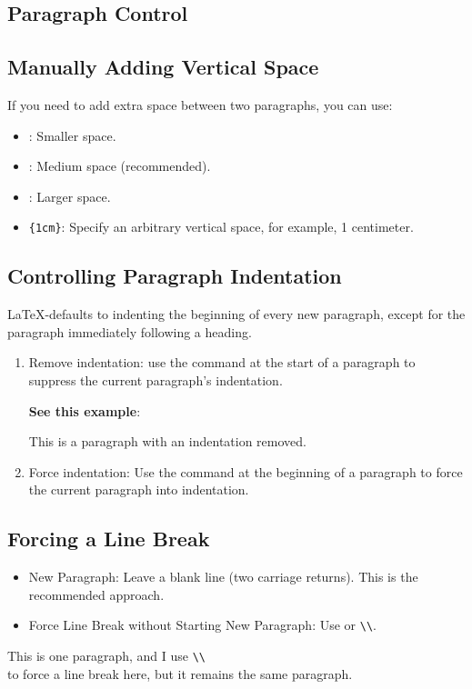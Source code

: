 \documentclass[12pt, letterpaper]{article}
\begin{document}
\begin{spacing}{1.3}
\section{Paragraph Control}
\subsection{Manually Adding Vertical Space}
If you need to add extra space between two paragraphs, you can use:
\begin{itemize}
    \item \texttt{\string\smallskip}: Smaller space.
    \item \texttt{\string\medskip}: Medium space (recommended).
    \item \texttt{\string\bigskip}: Larger space.
    \item \texttt{\string\vspace\{1cm\}}: Specify an arbitrary vertical space, for example, 1 centimeter.
\end{itemize}

\subsection{Controlling Paragraph Indentation}
\LaTeX-defaults to indenting the beginning of every new paragraph, except for the paragraph immediately following a heading.
\begin{enumerate}
    \item Remove indentation: use the \texttt{\string\noindent} command at the start of a paragraph to suppress the current paragraph's indentation.

\noindent \textbf{See this example}:

\noindent This is a paragraph with an indentation removed.

    \item Force indentation: Use the command \texttt{\string\indent} at the beginning of a paragraph to force the current paragraph into indentation.
\end{enumerate}

\subsection{Forcing a Line Break}
\begin{itemize}
    \item New Paragraph: Leave a blank line (two carriage returns). This is the recommended approach.
    \item Force Line Break without Starting New Paragraph: Use \texttt{\string\newline} or \texttt{\string\textbackslash{}\textbackslash{}}.
\end{itemize}
This is one paragraph, and I use \texttt{\string\textbackslash{}\textbackslash{}} \\ to force a line break here, but it remains the same paragraph.



\end{spacing}
\end{document}
